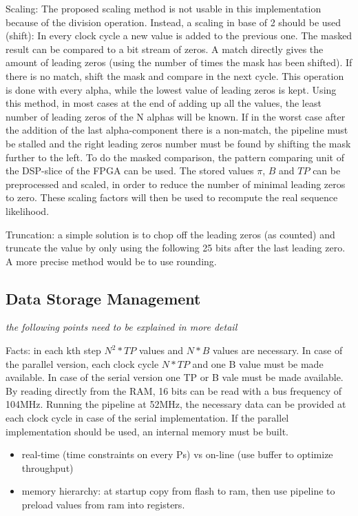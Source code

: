 \documentclass[mscthesis]{usiinfthesis}
\begin{document}
Scaling: The proposed scaling method is not usable in this implementation
because of the division operation. Instead, a scaling in base of 2 should be
used (shift): In every clock cycle a new value is added to the previous one.
The masked result can be compared to a bit stream of zeros. A match directly
gives the amount of leading zeros (using the number of times the mask has been
shifted). If there is no match, shift the mask and compare in the next cycle.
This operation is done with every alpha, while the lowest value of leading
zeros is kept. Using this method, in most cases at the end of adding up all the
values, the least number of leading zeros of the N alphas will be known. If in
the worst case after the addition of the last alpha-component there is
a non-match, the pipeline must be stalled and the right leading zeros number
must be found by shifting the mask further to the left. To do the masked
comparison, the pattern comparing unit of the DSP-slice of the FPGA can be
used. The stored values $ \pi $, $ B $ and $ TP $ can be preprocessed and
scaled, in order to reduce the number of minimal leading zeros to zero. These
scaling factors will then be used to recompute the real sequence likelihood.

Truncation: a simple solution is to chop off the leading zeros (as counted) and
truncate the value by only using the following 25 bits after the last leading
zero. A more precise method would be to use rounding.

\subsection{Data Storage Management}

\emph{\color{red}the following points need to be explained in more detail}

Facts:
in each kth step $ N^2*TP $ values and $ N*B $ values are necessary. In case of
the parallel version, each clock cycle $ N*TP $ and one B value must be made
available. In case of the serial version one TP or B vale must be made
available. By reading directly from the RAM, 16 bits can be read with a bus
frequency of 104MHz. Running the pipeline at 52MHz, the necessary data can be
provided at each clock cycle in case of the serial implementation. If the
parallel implementation should be used, an internal memory must be built.

\begin{itemize}
    \item real-time (time constraints on every Ps) vs on-line (use buffer to
        optimize throughput)
    \item memory hierarchy: at startup copy from flash to ram, then use pipeline
        to preload values from ram into registers.
\end{itemize}
\end{document}
